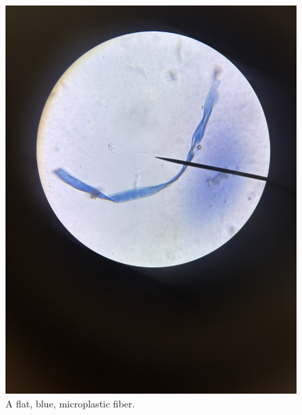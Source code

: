 \documentclass[fleqn,10pt]{SelfArx} %
\begin{document}
	\begin{figure}[h]
		\centering
		\includegraphics[width=1\linewidth]{Figures/BlueTwisty}
		\caption[Blue Microplastic Under Microscope]{A flat, blue, microplastic fiber.}
		\label{fig:bluetwist}
	\end{figure}
	
\end{document}
